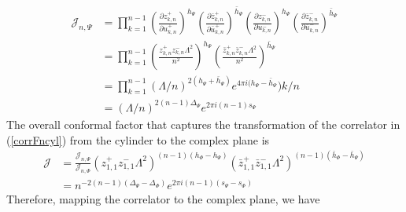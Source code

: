 \documentclass[11pt]{article}
\newcommand{\p}{\partial}
\newcommand{\mO}{\mathcal{O}}
\newcommand{\nn}{\nonumber}
\newcommand{\lb}{\left(}
\newcommand{\rb}{\right)}
\begin{document}
  \begin{align}
  \mathcal{J}_{n,\Psi}&=\prod_{k=1}^{n-1}\lb \frac{\partial z^+_{k,n}}{\partial u^+_{k,n}}\rb^{h_\Psi}\lb \frac{\partial \bar{z}^+_{k,n}}{\partial \bar{u}^+_{k,n}}\rb^{\bar{h}_\Psi}\lb \frac{\partial z^-_{k,n}}{\partial u^-_{k,n}}\rb^{h_\Psi}\lb \frac{\partial \bar{z}^-_{k,n}}{\partial \bar{u}^-_{k,n}}\rb^{\bar{h}_\Psi}\nn\\
  &=\prod_{k=1}^{n-1}\lb \frac{z^+_{k,n}z^-_{k,n}\Lambda^2}{n^2}\rb^{h_\Psi}\lb \frac{\bar{z}^+_{k,n}\bar{z}^-_{k,n}\Lambda^2}{n^2}\rb^{\bar{h}_\Psi}\nn\\
  &=\prod_{k=1}^{n-1} (\Lambda/n)^{2(h_\Psi+\bar{h}_\Psi)}e^{4\pi i (h_\Psi-\bar{h}_\Psi})k/n\nn\\
  &=(\Lambda/n)^{2(n-1)\Delta_\Psi}e^{2\pi i(n-1) s_\Psi}
  \end{align}
The overall conformal factor that captures the transformation of the correlator in (\ref{corrFncyl}) from the cylinder to the complex plane is
\begin{align}
\mathcal{J}&=\frac{\mathcal{J}_{n,\Psi}}{\mathcal{J}_{n,\Phi}}\lb z^+_{1,1}z^-_{1,1}\Lambda^2\rb^{(n-1)(h_\Phi-h_\Psi)}\lb\bar{z}^+_{1,1}\bar{z}^-_{1,1}\Lambda^2\rb^{(n-1)(\bar{h}_\Phi-\bar{h}_\Psi)}\nn\\
&=n^{-2(n-1)(\Delta_\Psi-\Delta_\Phi)}e^{2\pi i(n-1)(s_\Psi-s_\Phi)}
\end{align}
Therefore, mapping the correlator to the complex plane, we have 
\end{document}
